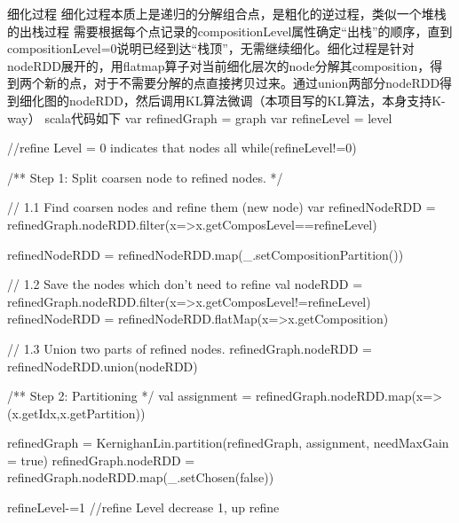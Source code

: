 细化过程
细化过程本质上是递归的分解组合点，是粗化的逆过程，类似一个堆栈的出栈过程
需要根据每个点记录的compositionLevel属性确定“出栈”的顺序，直到compositionLevel=0说明已经到达“栈顶”，无需继续细化。细化过程是针对nodeRDD展开的，用flatmap算子对当前细化层次的node分解其composition，得到两个新的点，对于不需要分解的点直接拷贝过来。通过union两部分nodeRDD得到细化图的nodeRDD，然后调用KL算法微调（本项目写的KL算法，本身支持K-way）
scala代码如下
var refinedGraph = graph
        var refineLevel = level

        //refine Level = 0 indicates that nodes all
        while(refineLevel!=0){
            /** Step 1: Split coarsen node to refined nodes. */

            // 1.1 Find coarsen nodes and refine them (new node)
            var refinedNodeRDD = refinedGraph.nodeRDD.filter(x=>x.getComposLevel==refineLevel)

            refinedNodeRDD = refinedNodeRDD.map(_.setCompositionPartition())

            // 1.2 Save the nodes which don't need to refine
            val nodeRDD = refinedGraph.nodeRDD.filter(x=>x.getComposLevel!=refineLevel)
            refinedNodeRDD = refinedNodeRDD.flatMap(x=>x.getComposition)

            // 1.3 Union two parts of refined nodes.
            refinedGraph.nodeRDD = refinedNodeRDD.union(nodeRDD)


            /** Step 2: Partitioning */
            val assignment = refinedGraph.nodeRDD.map(x=>(x.getIdx,x.getPartition))

            refinedGraph = KernighanLin.partition(refinedGraph, assignment, needMaxGain = true)
            refinedGraph.nodeRDD = refinedGraph.nodeRDD.map(_.setChosen(false))

            refineLevel-=1 //refine Level decrease 1, up refine
        }




